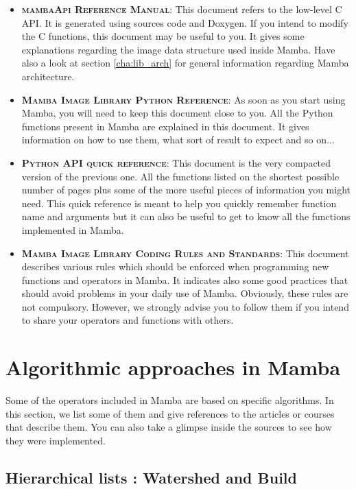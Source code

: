 \documentclass[a4paper,10pt,oneside]{article}
\begin{document}
\begin{itemize}
\item \textbf{\textsc{mambaApi Reference Manual}}: This document refers to the
low-level C API. It is generated using sources code and Doxygen. If you intend 
to modify the C functions, this document may be useful to you. It gives some
explanations regarding the image data structure used inside Mamba. Have also
a look at section \ref{cha:lib_arch} for general information regarding Mamba
architecture.
\item \textbf{\textsc{Mamba Image Library Python Reference}}: As soon as you
start using Mamba, you will need to keep this document close to you. All the
Python functions present in Mamba are explained in this document. It gives
information on how to use them, what sort of result to expect and so on... 
\item \textbf{\textsc{Python API quick reference}}: This document is the very
compacted version of the previous one. All the functions listed on the shortest
possible number of pages plus some of the more useful pieces of information you
might need. This quick reference is meant to help you quickly remember function
name and arguments but it can also be useful to get to know all the functions
implemented in Mamba.
\item \textbf{\textsc{Mamba Image Library Coding Rules and Standards}}: This
document describes various rules which should be enforced when programming new
functions and operators in Mamba. It indicates also some good practices that
should avoid problems in your daily use of Mamba. Obviously, these rules are not
compulsory. However, we strongly advise you to follow them if you intend to share
your operators and functions with others.
\end{itemize}

\pagebreak

\section{Algorithmic approaches in Mamba}

Some of the operators included in Mamba are based on specific algorithms.
In this section, we list some of them and give references to the articles or 
courses that describe them. You can also take a glimpse inside the sources to
see how they were implemented.

\subsection{Hierarchical lists : Watershed and Build}
\end{document}
